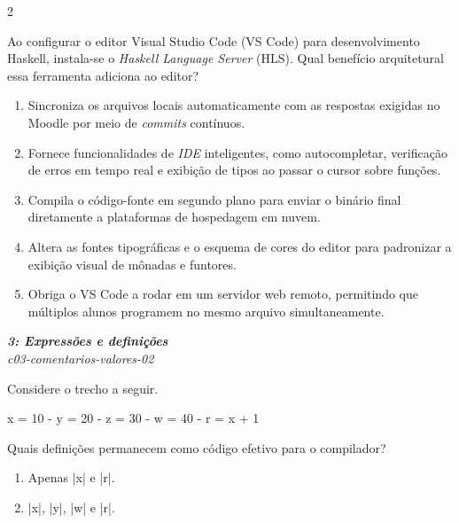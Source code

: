 \documentclass[a4paper,10pt,brazil]{article}
\begin{document}
\begin{multicols}{2}
\begin{flushright}
\end{flushright}
Ao configurar o editor Visual Studio Code (VS Code) para desenvolvimento Haskell, instala-se o \emph{Haskell Language Server} (HLS). Qual benefício arquitetural essa ferramenta adiciona ao editor?

\begin{enumerate}
  \item Sincroniza os arquivos locais automaticamente com as respostas exigidas no Moodle por meio de \emph{commits} contínuos.

  \item Fornece funcionalidades de \emph{IDE} inteligentes, como autocompletar, verificação de erros em tempo real e exibição de tipos ao passar o cursor sobre funções.

  \item Compila o código-fonte em segundo plano para enviar o binário final diretamente a plataformas de hospedagem em nuvem.

  \item Altera as fontes tipográficas e o esquema de cores do editor para padronizar a exibição visual de mônadas e funtores.

  \item Obriga o VS Code a rodar em um servidor web remoto, permitindo que múltiplos alunos programem no mesmo arquivo simultaneamente.


\end{enumerate}

\begin{flushright}
  \footnotesize
  \textit{\textbf{3: Expressões e definições}}\\
  \textit{c03-comentarios-valores-02}\\

\end{flushright}
Considere o trecho a seguir.

\begin{haskellcode}
x = 10
{-
y = 20
  {- z = 30 -}
w = 40
-}
r = x + 1
\end{haskellcode}

Quais definições permanecem como código efetivo para o compilador?

\begin{enumerate}
  \item Apenas \haskellinline|x| e \haskellinline|r|.

  \item \haskellinline|x|, \haskellinline|y|, \haskellinline|w| e \haskellinline|r|.


\end{enumerate}
\end{multicols}
\end{document}
